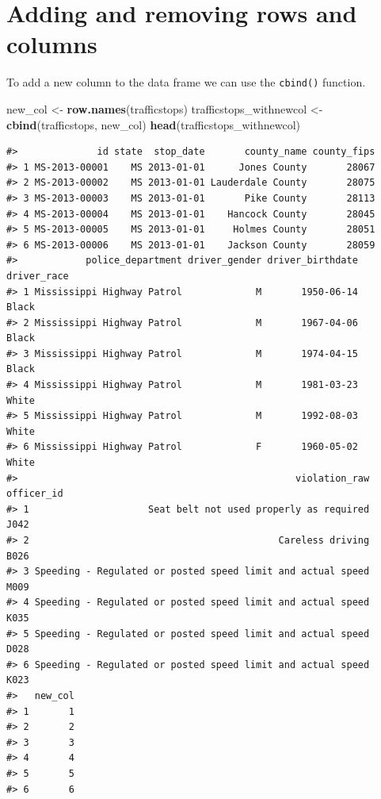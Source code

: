 \documentclass[]{book}
\newenvironment{Shaded}{\begin{snugshade}}{\end{snugshade}}
\newcommand{\KeywordTok}[1]{\textcolor[rgb]{0.13,0.29,0.53}{\textbf{#1}}}
\newcommand{\StringTok}[1]{\textcolor[rgb]{0.31,0.60,0.02}{#1}}
\newcommand{\NormalTok}[1]{#1}
\theoremstyle{definition}
\theoremstyle{definition}
\theoremstyle{remark}
\begin{document}
\section{Adding and removing rows and
columns}\label{adding-and-removing-rows-and-columns}

To add a new column to the data frame we can use the \texttt{cbind()}
function.

\begin{Shaded}
\begin{Highlighting}[]
\NormalTok{new_col <-}\StringTok{ }\KeywordTok{row.names}\NormalTok{(trafficstops)}
\NormalTok{trafficstops_withnewcol <-}\StringTok{ }\KeywordTok{cbind}\NormalTok{(trafficstops, new_col)}
\KeywordTok{head}\NormalTok{(trafficstops_withnewcol)}
\end{Highlighting}
\end{Shaded}

\begin{verbatim}
#>              id state  stop_date       county_name county_fips
#> 1 MS-2013-00001    MS 2013-01-01      Jones County       28067
#> 2 MS-2013-00002    MS 2013-01-01 Lauderdale County       28075
#> 3 MS-2013-00003    MS 2013-01-01       Pike County       28113
#> 4 MS-2013-00004    MS 2013-01-01    Hancock County       28045
#> 5 MS-2013-00005    MS 2013-01-01     Holmes County       28051
#> 6 MS-2013-00006    MS 2013-01-01    Jackson County       28059
#>            police_department driver_gender driver_birthdate driver_race
#> 1 Mississippi Highway Patrol             M       1950-06-14       Black
#> 2 Mississippi Highway Patrol             M       1967-04-06       Black
#> 3 Mississippi Highway Patrol             M       1974-04-15       Black
#> 4 Mississippi Highway Patrol             M       1981-03-23       White
#> 5 Mississippi Highway Patrol             M       1992-08-03       White
#> 6 Mississippi Highway Patrol             F       1960-05-02       White
#>                                                 violation_raw officer_id
#> 1                     Seat belt not used properly as required       J042
#> 2                                            Careless driving       B026
#> 3 Speeding - Regulated or posted speed limit and actual speed       M009
#> 4 Speeding - Regulated or posted speed limit and actual speed       K035
#> 5 Speeding - Regulated or posted speed limit and actual speed       D028
#> 6 Speeding - Regulated or posted speed limit and actual speed       K023
#>   new_col
#> 1       1
#> 2       2
#> 3       3
#> 4       4
#> 5       5
#> 6       6
\end{verbatim}
\end{document}
